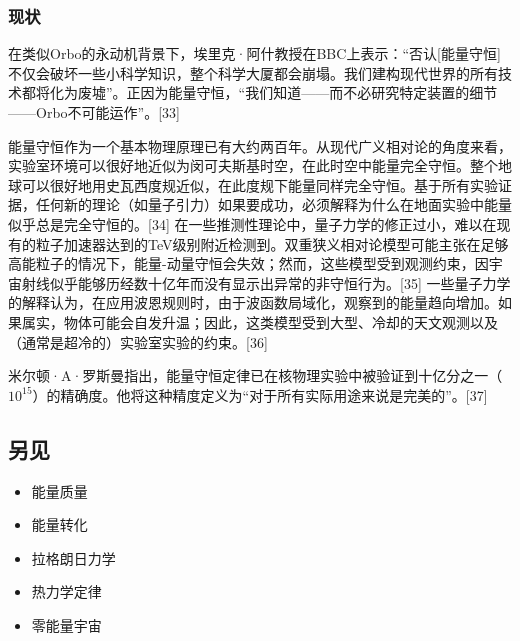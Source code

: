 \subsubsection{现状}
在类似Orbo的永动机背景下，埃里克·阿什教授在BBC上表示：“否认[能量守恒]不仅会破坏一些小科学知识，整个科学大厦都会崩塌。我们建构现代世界的所有技术都将化为废墟”。正因为能量守恒，“我们知道——而不必研究特定装置的细节——Orbo不可能运作”。[33]

能量守恒作为一个基本物理原理已有大约两百年。从现代广义相对论的角度来看，实验室环境可以很好地近似为闵可夫斯基时空，在此时空中能量完全守恒。整个地球可以很好地用史瓦西度规近似，在此度规下能量同样完全守恒。基于所有实验证据，任何新的理论（如量子引力）如果要成功，必须解释为什么在地面实验中能量似乎总是完全守恒的。[34] 在一些推测性理论中，量子力学的修正过小，难以在现有的粒子加速器达到的TeV级别附近检测到。双重狭义相对论模型可能主张在足够高能粒子的情况下，能量-动量守恒会失效；然而，这些模型受到观测约束，因宇宙射线似乎能够历经数十亿年而没有显示出异常的非守恒行为。[35] 一些量子力学的解释认为，在应用波恩规则时，由于波函数局域化，观察到的能量趋向增加。如果属实，物体可能会自发升温；因此，这类模型受到大型、冷却的天文观测以及（通常是超冷的）实验室实验的约束。[36]

米尔顿·A·罗斯曼指出，能量守恒定律已在核物理实验中被验证到十亿分之一（\(10^{15}\)）的精确度。他将这种精度定义为“对于所有实际用途来说是完美的”。[37]
\subsection{另见}
\begin{itemize}
\item 能量质量
\item 能量转化
\item 拉格朗日力学
\item 热力学定律
\item 零能量宇宙
\end{itemize}
